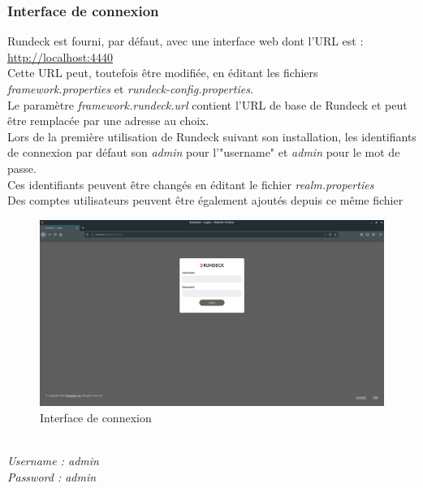\documentclass[12pt]{article}
\begin{document}
\subsubsection{Interface de connexion}
Rundeck est fourni, par défaut, avec une interface web dont l'URL est : 
\\
\underline{\url{http://localhost:4440}}
\vspace{0.2cm}
\\
Cette URL peut, toutefois être modifiée, en éditant les fichiers \textit{framework.properties} et \textit{rundeck-config.properties}.
\\
Le paramètre \textit{framework.rundeck.url} contient l'URL de base de Rundeck et peut être remplacée par une adresse au choix.
\\
Lors de la première utilisation de Rundeck suivant son installation, les identifiants de connexion par défaut son \textit{admin} pour l'"username" et \textit{admin} pour le mot de passe.
\\
Ces identifiants peuvent être changés en éditant le fichier \textit{realm.properties}
\\
Des comptes utilisateurs peuvent être également ajoutés depuis ce même fichier
\\
\begin{figure}[ht]
    \includegraphics[scale=0.23]{images/connexion.png}
    \caption{Interface de connexion}
\end{figure}
\\
\textit{Username : admin}
\\
\textit{Password : admin}
\end{document}
